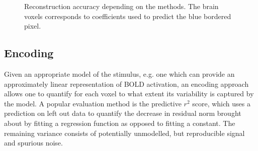 \documentclass{frontiersSCNS} %
\newcounter{x}
\newcounter{y}
\begin{document}
\begin{figure}[hbtp]
  \begin{center}
  \end{center}
  \caption{Reconstruction accuracy depending on the methods. The brain voxels
  corresponds to coefficients used to predict the blue bordered pixel.}
\label{fig:omp}
\end{figure}

\subsection{Encoding}
Given an appropriate model of the stimulus, e.g. one which can provide an approximately linear representation of BOLD activation, an encoding approach allows one to quantify for each voxel to what extent its variability is captured by the model. A popular evaluation method is the predictive \(r^2\) score, which uses a prediction on left out data to quantify the decrease in residual norm brought about by fitting a regression function as opposed to fitting a constant. %
The remaining variance consists of potentially unmodelled, but reproducible signal and spurious noise.
\end{document}
